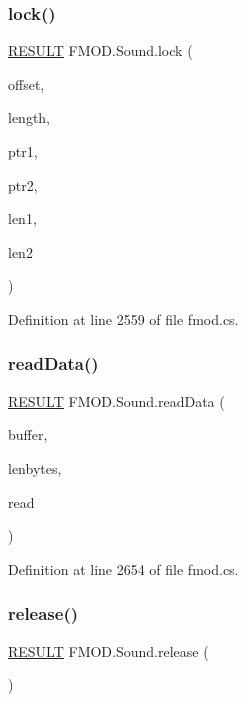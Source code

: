 \subsubsection{\texorpdfstring{lock()}{lock()}}
{\footnotesize\ttfamily \hyperlink{namespace_f_m_o_d_a305d1176ef3f8c8815861a60407ac33d}{R\+E\+S\+U\+LT} F\+M\+O\+D.\+Sound.\+lock (\begin{DoxyParamCaption}\item[{uint}]{offset,  }\item[{uint}]{length,  }\item[{out Int\+Ptr}]{ptr1,  }\item[{out Int\+Ptr}]{ptr2,  }\item[{out uint}]{len1,  }\item[{out uint}]{len2 }\end{DoxyParamCaption})}



Definition at line 2559 of file fmod.\+cs.

\mbox{\label{class_f_m_o_d_1_1_sound_ae6890433430ac375f36a0792ddd675ce}} 
\subsubsection{\texorpdfstring{read\+Data()}{readData()}}
{\footnotesize\ttfamily \hyperlink{namespace_f_m_o_d_a305d1176ef3f8c8815861a60407ac33d}{R\+E\+S\+U\+LT} F\+M\+O\+D.\+Sound.\+read\+Data (\begin{DoxyParamCaption}\item[{Int\+Ptr}]{buffer,  }\item[{uint}]{lenbytes,  }\item[{out uint}]{read }\end{DoxyParamCaption})}



Definition at line 2654 of file fmod.\+cs.

\mbox{\label{class_f_m_o_d_1_1_sound_ac0a53cb864be3225344389253ddcc218}} 
\subsubsection{\texorpdfstring{release()}{release()}}
{\footnotesize\ttfamily \hyperlink{namespace_f_m_o_d_a305d1176ef3f8c8815861a60407ac33d}{R\+E\+S\+U\+LT} F\+M\+O\+D.\+Sound.\+release (\begin{DoxyParamCaption}{ }\end{DoxyParamCaption})}



